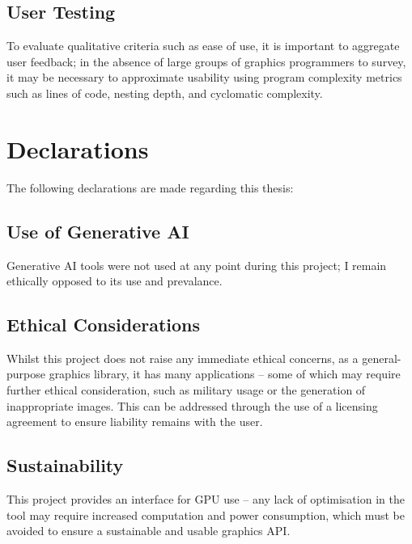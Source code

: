 \documentclass[12pt,twoside]{report}
\begin{document}
\section{User Testing}

To evaluate qualitative criteria such as ease of use, it is important to aggregate user feedback; in the absence of large groups of graphics programmers to survey, it may be necessary to approximate usability using program complexity metrics such as lines of code, nesting depth, and cyclomatic complexity.\autocite{mccabe_complexity_1976}



\chapter{Declarations}

The following declarations are made regarding this thesis:

\section{Use of Generative AI}

Generative AI tools were not used at any point during this project; I remain ethically opposed to its use and prevalance.

\section{Ethical Considerations}

Whilst this project does not raise any immediate ethical concerns, as a general-purpose graphics library, it has many applications -- some of which may require further ethical consideration, such as military usage or the generation of inappropriate images. This can be addressed through the use of a licensing agreement to ensure liability remains with the user.

\section{Sustainability}

This project provides an interface for GPU use -- any lack of optimisation in the tool may require increased computation and power consumption, which must be avoided to ensure a sustainable and usable graphics API.


\printbibliography
\end{document}
